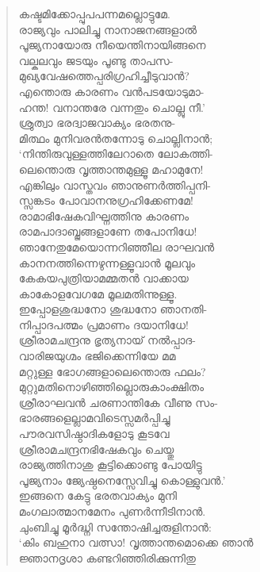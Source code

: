 \begin{verse}
കഷ്ടമിക്കോപ്പുപപന്നമല്ലൊട്ടുമേ.\\
രാജ്യവും പാലിച്ചു നാനാജനങ്ങളാല്‍\\
പൂജ്യനായോരു നീയെന്തിനായിങ്ങനെ\\
വല്കലവും ജടയും പൂണ്ടു താപസ-\\
മുഖ്യവേഷത്തെപ്പരിഗ്രഹിച്ചീടുവാന്‍?\\
എന്തൊരു കാരണം വന്‍പടയോടുമാ-\\
ഹന്ത! വനാന്തരേ വന്നതും ചൊല്ലു നീ.’\\
ശ്രുത്വാ ഭരദ്വാജവാക്യം ഭരതനു-\\
മിത്ഥം മുനിവരന്‍തന്നോടു ചൊല്ലിനാന്‍;\\
‘നിന്തിരുവുള്ളത്തിലേറാതെ ലോകത്തി-\\
ലെന്തൊരു വൃത്താന്തമുള്ളൂ മഹാമുനേ!\\
എങ്കിലും വാസ്തവം ഞാനുണര്‍ത്തിപ്പനി-\\
സ്സങ്കടം പോവാനനുഗ്രഹിക്കേണമേ!\\
രാമാഭിഷേകവിഘ്നത്തിനു കാരണം\\
രാമപാദാബ്ജങ്ങളാണേ തപോനിധേ!\\
ഞാനേതുമേയൊന്നറിഞ്ഞീല രാഘവന്‍\\
കാനനത്തിന്നെഴുന്നള്ളൂവാന്‍ മൂലവും\\
കേകയപുത്രിയാമമ്മതന്‍ വാക്കായ\\
കാകോളവേഗമേ മൂലമതിന്നുള്ളൂ.\\
ഇപ്പോളശുദ്ധനോ ശുദ്ധനോ ഞാനതി-\\
നിപ്പാദപത്മം പ്രമാണം ദയാനിധേ!\\
ശ്രീരാമചന്ദ്രനു ഭൃത്യനായ് നല്‍പ്പാദ-\\
വാരിജയുഗ്മം ഭജിക്കെന്നിയേ മമ\\
മറ്റുള്ള ഭോഗങ്ങളാലെന്തൊരു ഫലം?\\
മുറ്റുമതിനൊഴിഞ്ഞില്ലൊരുകാംക്ഷിതം\\
ശ്രീരാഘവന്‍ ചരണാന്തികേ വീണു സം-\\
ഭാരങ്ങളെല്ലാമവിടെസ്സമര്‍പ്പിച്ചു\\
പൗരവസിഷ്ഠാദികളോടു കൂടവേ\\
ശ്രീരാമചന്ദ്രനഭിഷേകവും ചെയ്തു\\
രാജ്യത്തിനാശു കൂട്ടിക്കൊണ്ടു പോയിട്ടു\\
പൂജ്യനാം ജ്യേഷ്ഠനെസ്സേവിച്ചു കൊള്ളുവന്‍.’\\
ഇങ്ങനെ കേട്ടു ഭരതവാക്യം മുനി\\
മംഗലാത്മാനമേനം പുണര്‍ന്നീടിനാന്‍.\\
ചുംബിച്ചു മൂര്‍ദ്ധ്നി സന്തോഷിച്ചരുളിനാന്‍:\\
‘കിം ബഹുനാ വത്സാ! വൃത്താന്തമൊക്കെ ഞാന്‍\\
ജ്ഞാനദൃശാ കണ്ടറിഞ്ഞിരിക്കുന്നിതു\\

\end{verse}
